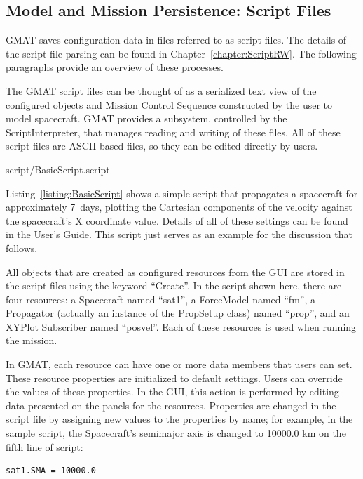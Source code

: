 \subsection{Model and Mission Persistence: Script Files}

GMAT saves configuration data in files referred to as script files.  The details of the script file
parsing can be found in Chapter~\ref{chapter:ScriptRW}.  The following paragraphs provide an
overview of these processes.

The GMAT script files can be thought of as a serialized text view of the configured objects and
Mission Control Sequence constructed by the user to model spacecraft.  GMAT provides a subsystem,
controlled by the ScriptInterpreter, that manages reading and writing of these files.  All of these
script files are ASCII based files, so they can be edited directly by users.

\lstset{numbers=left}

{script/BasicScript.script}
\lstset{numbers=none}

Listing~\ref{listing:BasicScript} shows a simple script that propagates a spacecraft for
approximately 7~days, plotting the Cartesian components of the velocity against the spacecraft's X
coordinate value.  Details of all of these settings can be found in the User's
Guide\cite{userGuide}. This script just serves as an example for the discussion that follows.

All objects that are created as configured resources from the GUI are stored in the script files
using the keyword ``Create''.  In the script shown here, there are four resources: a Spacecraft
named ``sat1'', a ForceModel named ``fm'', a Propagator (actually an instance of the PropSetup
class) named ``prop'', and an XYPlot Subscriber named ``posvel''.  Each of these resources is used
when running the mission.

In GMAT, each resource can have one or more data members that users can set.  These resource
properties are initialized to default settings.  Users can override the values of these properties.
In the GUI, this action is performed by editing data presented on the panels for the resources.
Properties are changed in the script file by assigning new values to the properties by name; for
example, in the sample script, the Spacecraft's semimajor axis is changed to 10000.0 km on the fifth
line of script:

\begin{lstlisting}
sat1.SMA = 10000.0
\end{lstlisting}

